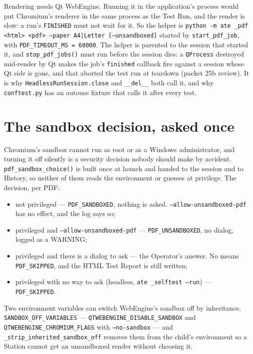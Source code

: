 Rendering needs Qt WebEngine. Running it in the application's process would put Chromium's renderer in
the same process as the Test Run, and the render is slow: a run's \texttt{FINISHED} must not wait for it.
So the helper is \texttt{python -m ate \_\allowbreak{}pdf <html> <pdf> --paper A4|Letter [--unsandboxed]} started by
\texttt{start\_pdf\_job}, with \texttt{PDF\_\allowbreak{}TIMEOUT\_\allowbreak{}MS = 60000}. The helper is parented to the session
that started it, and \texttt{stop\_pdf\_jobs()} must run before the session dies: a \texttt{QProcess}
destroyed mid-render by Qt makes the job's \texttt{finished} callback fire against a session whose Qt
side is gone, and that aborted the test run at teardown (packet 25b review). It is why
\texttt{HeadlessRunSession.close} and \texttt{\_\_del\_\_} both call it, and why
\texttt{conftest.py} has an autouse fixture that calls it after every test.

\section{The sandbox decision, asked once}

Chromium's sandbox cannot run as root or as a Windows administrator, and turning it off silently is a
security decision nobody should make by accident. \texttt{pdf\_\allowbreak{}sandbox\_\allowbreak{}choice()} is built once at launch
and handed to the session and to History, so neither of them reads the environment or guesses at
privilege. The decision, per PDF:

\begin{itemize}
  \item not privileged --- \texttt{PDF\_SANDBOXED}, nothing is asked. \texttt{--allow-unsandboxed-pdf}
    has no effect, and the log says so;
  \item privileged and \texttt{--allow-unsandboxed-pdf} --- \texttt{PDF\_UNSANDBOXED}, no dialog, logged
    as a WARNING;
  \item privileged and there is a dialog to ask --- the Operator's answer. No means \texttt{PDF\_SKIPPED},
    and the HTML Test Report is still written;
  \item privileged with no way to ask (headless, \texttt{ate \_selftest --run}) --- \texttt{PDF\_SKIPPED}.
\end{itemize}

Two environment variables can switch WebEngine's sandbox off by inheritance,
\texttt{SANDBOX\_\allowbreak{}OFF\_\allowbreak{}VARIABLES} --- \texttt{QTWEBENGINE\_\allowbreak{}DISABLE\_\allowbreak{}SANDBOX} and
\texttt{QTWEBENGINE\_\allowbreak{}CHROMIUM\_\allowbreak{}FLAGS} with \texttt{--no-sandbox} --- and \texttt{\_\allowbreak{}strip\_\allowbreak{}inherited\_\allowbreak{}sandbox\_\allowbreak{}off}
removes them from the child's environment so a Station cannot get an unsandboxed render without choosing
it.

